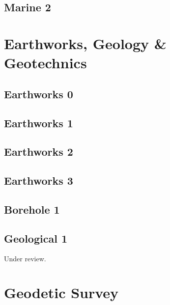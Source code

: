 \documentclass{scrartcl}
\begin{document}
\subsection{Marine 2} %
\label{sec:marine_2}
\clearpage

\section{Earthworks, Geology \& Geotechnics}
\label{sec:earthworks}

\subsection{Earthworks 0}
\label{sec:earth_0}
\clearpage

\subsection{Earthworks 1}
\label{sec:earth_1}
\clearpage

\subsection{Earthworks 2}
\label{sec:earth_2}
\clearpage

\subsection{Earthworks 3}
\label{sec:earth_3}
\clearpage

\subsection{Borehole 1}
\label{sec:borehole_1}
\clearpage

\subsection{Geological 1} %
\label{sec:geological_1}
Under review.%
\clearpage

\section{Geodetic Survey}
\label{sec:geodetic_survey}
\end{document}
